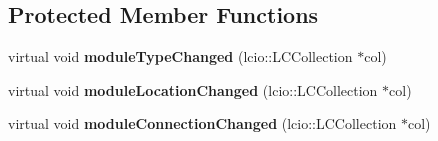 \subsection*{Protected Member Functions}
\begin{DoxyCompactItemize}
\item 
virtual void {\bfseries module\-Type\-Changed} (lcio\-::\-L\-C\-Collection $\ast$col)\label{classCALICE_1_1fastMappingMCProcessor_ac8ab2a7a6f74c8431825a07f968cc5c8}

\item 
virtual void {\bfseries module\-Location\-Changed} (lcio\-::\-L\-C\-Collection $\ast$col)\label{classCALICE_1_1fastMappingMCProcessor_af1594c423e9d7594ac32dfa3aefed41a}

\item 
virtual void {\bfseries module\-Connection\-Changed} (lcio\-::\-L\-C\-Collection $\ast$col)\label{classCALICE_1_1fastMappingMCProcessor_a80ccd4b7f2477e2ef827150d26b30d0d}

\end{DoxyCompactItemize}
